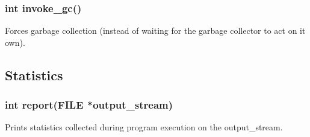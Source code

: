 \documentclass[12pt]{article}
\begin{document}
\subsubsection{int invoke\_gc()}

Forces garbage collection (instead of waiting for the garbage collector to act on it own).

\subsection{Statistics}

\subsubsection{int report(FILE *output\_stream)}

Prints statistics collected during program execution on the output\_stream.
\end{document}
